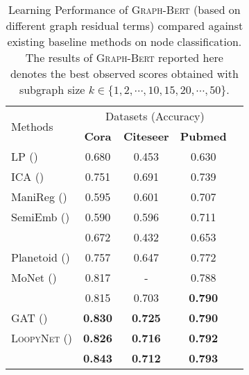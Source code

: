 \documentclass{article}
\newcommand{\our}{\textsc{Graph-Bert}}
\newcommand{\gcn}{\textsc{GCN}}
\newcommand{\gat}{\textsc{GAT}}
\newcommand{\loopy}{\textsc{LoopyNet}}
\begin{document}
\begin{table}[t]
\caption{Learning Performance of {\our} (based on different graph residual terms) compared against existing baseline methods on node classification. The results of {\our} reported here denotes the best observed scores obtained with subgraph size $k \in \{1, 2, \cdots, 10, 15, 20, \cdots, 50\}$.}\label{tab:node_classification}
\centering
\small
\setlength{\tabcolsep}{3pt}
\begin{tabular}{l c c c c }
\toprule
 \multirow{2}{*}{Methods}  & \multicolumn{3}{c}{Datasets (Accuracy)} \\
\cline{2-4}
\addlinespace[0.05cm]
& \textbf{Cora} & \textbf{Citeseer} & \textbf{Pubmed} \\
\hline
\addlinespace[0.05cm]

{LP (\cite{ZGL03}) } &0.680 &0.453 &0.630  \\
{ICA (\cite{LG03})} &0.751  &0.691  &0.739   \\
{ManiReg (\cite{BNS06})} &0.595  &0.601  &0.707   \\
{SemiEmb (\cite{WRC08})} &0.590  &0.596  &0.711  \\
\hline
\addlinespace[0.05cm]
{DeepWalk (\cite{PAS14})} &0.672  &0.432  &0.653   \\
{Planetoid (\cite{YCS16})} &0.757  &0.647  &0.772  \\
{MoNet (\cite{MBMRSB16})} &0.817  &-  &0.788  \\
\hline
\addlinespace[0.05cm]
{{\gcn} (\cite{Kipf_Semi_CORR_16})} &0.815  &0.703  &\textbf{0.790}   \\
{{\gat} (\cite{Velickovic_Graph_ICLR_18})} &\textbf{0.830}  &\textbf{0.725}  &\textbf{0.790}  \\
{{\loopy} (\cite{loopynet})} &\textbf{0.826}  &\textbf{0.716}  &\textbf{0.792}  \\
\hline
\addlinespace[0.05cm]
{\our} &\textbf{0.843}  &\textbf{0.712}  &\textbf{0.793}  \\
\bottomrule
\end{tabular}
\end{table}
\end{document}
